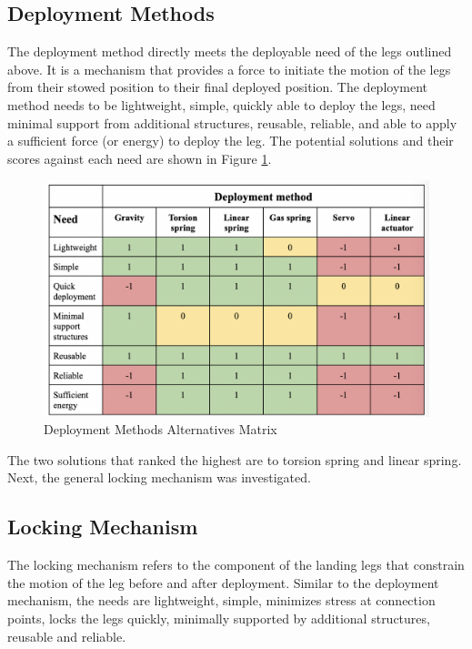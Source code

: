 \subsection{Deployment Methods}

The deployment method directly meets the deployable need of the legs outlined above. It is a mechanism that provides a force to initiate the motion of the legs from their stowed position to their final deployed position. The deployment method needs to be lightweight, simple, quickly able to deploy the legs, need minimal support from additional structures, reusable, reliable, and able to apply a sufficient force (or energy) to deploy the leg. The potential solutions and their scores against each need are shown in Figure \ref{figs:dmam}.

\begin{figure}[H]
\centering
\includegraphics[scale=0.7]{src/figs/deploymentmethodalternativesmatrix.png}
\caption{Deployment Methods Alternatives Matrix}
\label{figs:dmam}
\end{figure}

The two solutions that ranked the highest are to torsion spring and linear spring. Next, the general locking mechanism was investigated. 

\subsection{Locking Mechanism}

The locking mechanism refers to the component of the landing legs that constrain the motion of the leg before and after deployment. Similar to the deployment mechanism, the needs are lightweight, simple, minimizes stress at connection points, locks the legs quickly, minimally supported by additional structures, reusable and reliable. 

